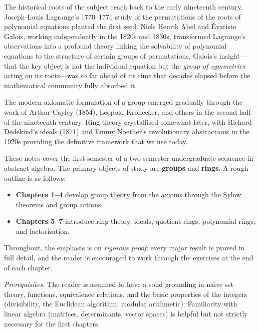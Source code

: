 \documentclass[12pt,a4paper,openany]{book}
\theoremstyle{definition}
\theoremstyle{remark}
\begin{document}
The historical roots of the subject reach back to the early nineteenth
century.  Joseph-Louis Lagrange's 1770--1771 study of the permutations of
the roots of polynomial equations planted the first seed.  Niels Henrik Abel
and \'Evariste Galois, working independently in the 1820s and 1830s,
transformed Lagrange's observations into a profound theory linking the
solvability of polynomial equations to the structure of certain groups of
permutations.  Galois's insight---that the key object is not the individual
equation but the \emph{group of symmetries} acting on its roots---was so far
ahead of its time that decades elapsed before the mathematical community
fully absorbed it.

The modern axiomatic formulation of a group emerged gradually through the
work of Arthur Cayley (1854), Leopold Kronecker, and others in the second
half of the nineteenth century.  Ring theory crystallised somewhat later,
with Richard Dedekind's ideals (1871) and Emmy Noether's revolutionary
abstractions in the 1920s providing the definitive framework that we use
today.

These notes cover the first semester of a two-semester undergraduate sequence
in abstract algebra.  The primary objects of study are \textbf{groups} and
\textbf{rings}.  A rough outline is as follows:

\begin{itemize}[leftmargin=2em]
  \item \textbf{Chapters 1--4} develop group theory from the axioms through
    the Sylow theorems and group actions.
  \item \textbf{Chapters 5--7} introduce ring theory, ideals, quotient
    rings, polynomial rings, and factorisation.
\end{itemize}

Throughout, the emphasis is on \emph{rigorous proof}: every major result is
proved in full detail, and the reader is encouraged to work through the
exercises at the end of each chapter.

\bigskip

\noindent\textit{Prerequisites.}  The reader is assumed to have a solid
grounding in naive set theory, functions, equivalence relations, and the
basic properties of the integers (divisibility, the Euclidean algorithm,
modular arithmetic).  Familiarity with linear algebra (matrices, determinants,
vector spaces) is helpful but not strictly necessary for the first chapters.

\bigskip
\end{document}
